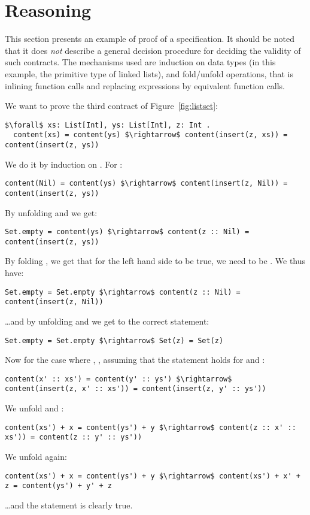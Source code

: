 \section{Reasoning}
This section presents an example of proof of a specification. It should be
noted that it does \emph{not} describe a general decision procedure for
deciding the validity of such contracts. The mechanisms used are induction on
data types (in this example, the primitive type of linked lists), and
fold/unfold operations, that is inlining function calls and replacing
expressions by equivalent function calls.

We want to prove the third contract of Figure~\ref{fig:listset}:
\begin{lstlisting}
$\forall$ xs: List[Int], ys: List[Int], z: Int .
  content(xs) = content(ys) $\rightarrow$ content(insert(z, xs)) = content(insert(z, ys))
\end{lstlisting}

We do it by induction on . For :
\begin{lstlisting}
content(Nil) = content(ys) $\rightarrow$ content(insert(z, Nil)) = content(insert(z, ys))
\end{lstlisting} 
By unfolding  and  we get:
\begin{lstlisting}
Set.empty = content(ys) $\rightarrow$ content(z :: Nil) = content(insert(z, ys))
\end{lstlisting}
By folding , we get that for the left hand side to be true, we need  to be . We thus have:
\begin{lstlisting}
Set.empty = Set.empty $\rightarrow$ content(z :: Nil) = content(insert(z, Nil))
\end{lstlisting}
\ldots and by unfolding  and  we get to the correct statement:
\begin{lstlisting}
Set.empty = Set.empty $\rightarrow$ Set(z) = Set(z)
\end{lstlisting}

Now for the case where , , assuming
that the statement holds for  and :
\begin{lstlisting}
content(x' :: xs') = content(y' :: ys') $\rightarrow$ content(insert(z, x' :: xs')) = content(insert(z, y' :: ys'))
\end{lstlisting}
We unfold  and :
\begin{lstlisting}
content(xs') + x = content(ys') + y $\rightarrow$ content(z :: x' :: xs')) = content(z :: y' :: ys'))
\end{lstlisting}
We unfold  again:
\begin{lstlisting}
content(xs') + x = content(ys') + y $\rightarrow$ content(xs') + x' + z = content(ys') + y' + z
\end{lstlisting}
\ldots and the statement is clearly true.
